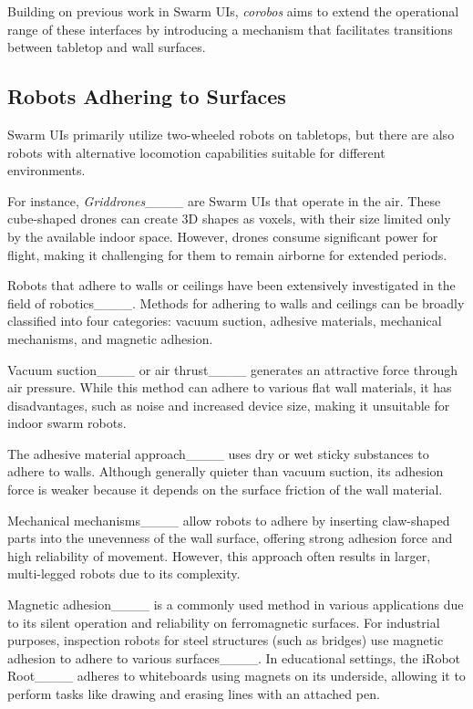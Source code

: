 Building on previous work in Swarm UIs, \textit{corobos} aims to extend the operational range of these interfaces by introducing a mechanism that facilitates transitions between tabletop and wall surfaces.


\subsection{Robots Adhering to Surfaces}
Swarm UIs primarily utilize two-wheeled robots on tabletops, but there are also robots with alternative locomotion capabilities suitable for different environments.

For instance, \textit{Griddrones}____ are Swarm UIs that operate in the air.
These cube-shaped drones can create 3D shapes as voxels, with their size limited only by the available indoor space.
However, drones consume significant power for flight, making it challenging for them to remain airborne for extended periods.

Robots that adhere to walls or ceilings have been extensively investigated in the field of robotics____.
Methods for adhering to walls and ceilings can be broadly classified into four categories: vacuum suction, adhesive materials, mechanical mechanisms, and magnetic adhesion.

Vacuum suction____ or air thrust____ generates an attractive force through air pressure.
While this method can adhere to various flat wall materials, it has disadvantages, such as noise and increased device size, making it unsuitable for indoor swarm robots.

The adhesive material approach____ uses dry or wet sticky substances to adhere to walls.
Although generally quieter than vacuum suction, its adhesion force is weaker because it depends on the surface friction of the wall material.

Mechanical mechanisms____ allow robots to adhere by inserting claw-shaped parts into the unevenness of the wall surface, offering strong adhesion force and high reliability of movement.
However, this approach often results in larger, multi-legged robots due to its complexity.

Magnetic adhesion____ is a commonly used method in various applications due to its silent operation and reliability on ferromagnetic surfaces.
For industrial purposes, inspection robots for steel structures (such as bridges) use magnetic adhesion to adhere to various surfaces____.
In educational settings, the iRobot Root\texttrademark____ adheres to whiteboards using magnets on its underside, allowing it to perform tasks like drawing and erasing lines with an attached pen.

